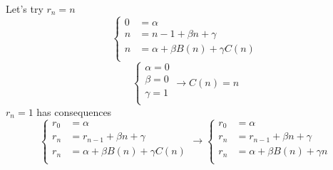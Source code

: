 Let's try $ r_n = n $ 
\begin{equation*}
    \left\{
        \begin{array}{ll}
            0 &= \alpha\\
            n &= n-1+\beta n+\gamma\\
            n &= \alpha + \beta B(n) + \gamma C(n)\\
        \end{array}
    \right.
\end{equation*}
\begin{equation*}
    \left\{
        \begin{array}{l}
            \alpha = 0\\
            \beta = 0\\
            \gamma = 1\\
        \end{array}
    \right.
    \rightarrow C(n) = n
\end{equation*}
$ r_n=1 $ has consequences
\begin{equation*}
    \left\{
        \begin{array}{ll}
            r_0 &= \alpha\\
            r_n &= r_{n-1}+\beta n+\gamma\\
            r_n &= \alpha + \beta B(n) + \gamma C(n)\\
        \end{array}
    \right.
    \rightarrow
    \left\{
        \begin{array}{ll}
            r_0 &= \alpha\\
            r_n &= r_{n-1}+\beta n+\gamma\\
            r_n &= \alpha + \beta B(n) + \gamma n\\
        \end{array}
    \right.
\end{equation*}


